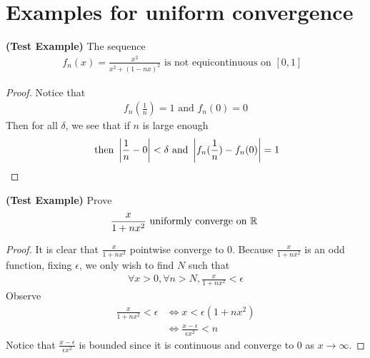 \documentclass{report}
\begin{document}
\section{Examples for uniform convergence} 
\begin{theorem}
\textbf{(Test Example)} The sequence 
\begin{align*}
f_n(x)=\frac{x^2}{x^2+(1-nx)^2}\text{ is not equicontinuous on $[0,1]$ }
\end{align*}
\end{theorem}
\begin{proof}
Notice that 
\begin{align*}
f_n(\frac{1}{n})=1\text{ and }f_n(0)=0
\end{align*}
Then for all $\delta$, we see that if $n$ is large enough 
 \begin{align*}
\text{ then }\left|\frac{1}{n}-0\right|<\delta \text{ and }\left|f_n(\frac{1}{n})-f_n(0)\right|=1
\end{align*}
\end{proof}
\begin{theorem}
\textbf{(Test Example)} Prove 
\begin{align*}
\frac{x}{1+nx^2}\text{ uniformly converge on $\mathbb{R}$ }
\end{align*}
\end{theorem}
\begin{proof}
It is clear that $\frac{x}{1+nx^2}$ pointwise converge to $0$. Because $\frac{x}{1+nx^2}$ is an odd function, fixing $\epsilon $, we only wish to find $N$ such that 
\begin{align*}
\forall x>0, \forall n>N, \frac{x}{1+nx^2}<\epsilon 
\end{align*}
Observe 
\begin{align*}
  \frac{x}{1+nx^2}<\epsilon &\iff x<\epsilon (1+nx^2)\\
  &\iff \frac{x-\epsilon }{\epsilon x^2}<n
\end{align*}
Notice that $\frac{x-\epsilon }{\epsilon x^2}$ is bounded since it is continuous and converge to $0$ as  $x \to \infty$. 
\end{proof}
\end{document}
